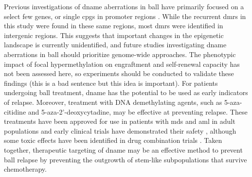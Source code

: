 Previous investigations of \gls{dname} aberrations in \gls{ball} have primarily focused on a select few genes, or single \glspl{cpg} in promoter regions \cite{nordlundGenomewideSignaturesDifferential2013,leeEpigeneticRemodelingBcell2015,garcia-maneroDNAMethylationMultiple2002,garcia-maneroAberrantDNAMethylation2003}.
While the recurrent \glspl{dmr} in this study were found in these same regions, most \glspl{dmr} were identified in intergenic regions.
This suggests that important changes in the epigenetic landscape is currently unidentified, and future studies investigating \gls{dname} aberrations in \gls{ball} should prioritize genome-wide approaches.
The phenotypic impact of focal hypermethylation on engraftment and self-renewal capacity has not been assessed here, so experiments should be conducted to validate these findings (this is a bad sentence but this idea is important).
For patients undergoing \gls{ball} treatment, \gls{dname} has the potential to be used as early indicators of relapse.
Moreover, treatment with DNA demethylating agents, such as 5-aza-citidine and 5-aza-2'-deoxycytadine, may be effective at preventing relapse.
These treatments have been approved for use in patients with \gls{mds} and \gls{aml} in adult populations and early clinical trials have demonstrated their safety \cite{bentonSafetyClinicalActivity2014,nationalcancerinstitutenciGroupwidePilotStudy2021}, although some toxic effects have been identified in drug combination trials \cite{therapeuticadvancesinchildhoodleukemiaconsortiumPilotStudyDecitabine2020}.
Taken together, therapeutic targeting of \gls{dname} may be an effective method to prevent \gls{ball} relapse by preventing the outgrowth of stem-like subpopulations that survive chemotherapy.
